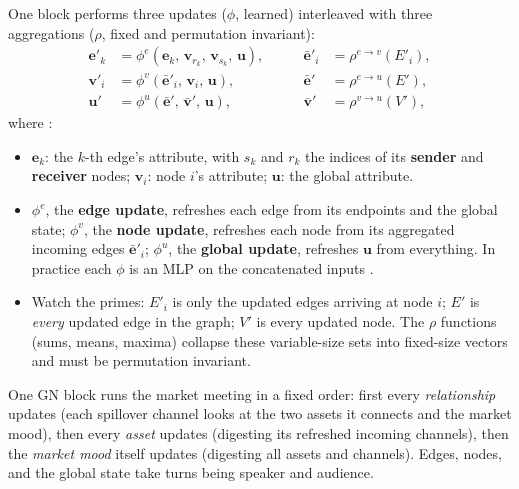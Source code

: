 One block performs three updates ($\phi$, learned) interleaved with three aggregations ($\rho$, fixed and permutation invariant):
\begin{equation}\label{eq:gnn:gnblock}
\begin{aligned}
  \mathbf{e}'_k &= \phi^e\!\left(\mathbf{e}_k,\, \mathbf{v}_{r_k},\, \mathbf{v}_{s_k},\, \mathbf{u}\right),
  &\qquad \bar{\mathbf{e}}'_i &= \rho^{e \rightarrow v}\!\left(E'_i\right),\\
  \mathbf{v}'_i &= \phi^v\!\left(\bar{\mathbf{e}}'_i,\, \mathbf{v}_i,\, \mathbf{u}\right),
  &\qquad \bar{\mathbf{e}}' &= \rho^{e \rightarrow u}\!\left(E'\right),\\
  \mathbf{u}' &= \phi^u\!\left(\bar{\mathbf{e}}',\, \bar{\mathbf{v}}',\, \mathbf{u}\right),
  &\qquad \bar{\mathbf{v}}' &= \rho^{v \rightarrow u}\!\left(V'\right),
\end{aligned}
\end{equation}
where \citep[eq.~1, p.~12]{Battaglia2018}:
\begin{itemize}[nosep]
  \item $\mathbf{e}_k$: the $k$-th edge's attribute, with $s_k$ and $r_k$ the indices of its \textbf{sender} and \textbf{receiver} nodes; $\mathbf{v}_i$: node $i$'s attribute; $\mathbf{u}$: the global attribute.
  \item $\phi^e$, the \textbf{edge update}, refreshes each edge from its endpoints and the global state; $\phi^v$, the \textbf{node update}, refreshes each node from its aggregated incoming edges $\bar{\mathbf{e}}'_i$; $\phi^u$, the \textbf{global update}, refreshes $\mathbf{u}$ from everything. In practice each $\phi$ is an MLP on the concatenated inputs \citep[eq.~2, p.~15]{Battaglia2018}.
  \item Watch the primes: $E'_i$ is only the updated edges arriving at node $i$; $E'$ is \emph{every} updated edge in the graph; $V'$ is every updated node. The $\rho$ functions (sums, means, maxima) collapse these variable-size sets into fixed-size vectors and must be permutation invariant.
\end{itemize}

\begin{intuition}
One GN block runs the market meeting in a fixed order: first every \emph{relationship} updates (each spillover channel looks at the two assets it connects and the market mood), then every \emph{asset} updates (digesting its refreshed incoming channels), then the \emph{market mood} itself updates (digesting all assets and channels). Edges, nodes, and the global state take turns being speaker and audience.
\end{intuition}

